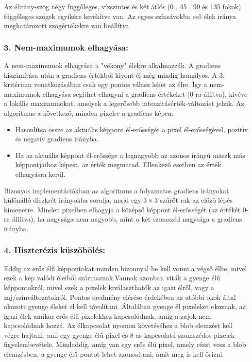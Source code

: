 Az élirány-szög négy függőleges, vízszintes és két átlós (0 , 45 , 90  és 135 fokok) függőleges szögek egyikére kerekítve van. Az egyes színsávokba eső élek iránya meghatározott szögértékekre van beállítva.

\subsubsection{3. Nem-maximumok elhagyása:}

A nem-maximumok elhagyása a "vékony" élekre alkalmazzák. A gradiens kiszámítása után a gradiens értékből kivont él még mindig homályos. A 3. kritérium vonatkozásában csak egy pontos válasz lehet az élre. Így a nem-maximumok elhagyása segíthet elhagyni a gradiens értékeket (0-ra állítva), kivéve a lokális maximumokat, amelyek a legerősebb intenzitásérték-változást jelzik. Az algoritmus a következő, minden pixelre a gradiens képen:
\begin{itemize}
\item Hasonlítsa össze az aktuális képpont él-erősségét a pixel él-erősségével, pozitív és negatív gradiens irányba.
\item Ha az aktuális képpont él-erőssége a legnagyobb az azonos irányú maszk más képpontjaihoz képest, az érték megmarad. Ellenkező esetben az érték elhagyásra kerül.
\end{itemize}

Bizonyos implementációkban az algoritmus a folyamatos gradiens irányokat különálló diszkrét irányokba sorolja, majd egy $3 \times 3$ szűrőt rak az előző lépés kimenetre. Minden pixelben elhagyja a középső képpont él-erősségét (az értékét 0-ra állítva), ha nagysága nem nagyobb, mint a két szomszéd nagysága a gradiens irányba.

\subsubsection{4. Hiszterézis küszöbölés:}

Eddig az erős élű képpontokat minden bizonnyal be kell vonni a végső élbe, mivel ezek a kép valódi éleiből származnak.Vannak azonban viták a gyenge élű képpontokról, mivel ezek a pixelek kiválaszthatók az igazi élről, vagy a zaj/színváltozatokról. Pontos eredmény elérése érdekében az utóbbi okok által okozott gyenge éleket el kell távolítani. Általában gyenge él pixeleket okoznak, az igazi élek amikor erős élű pixelekhez kapcsolódnak, amíg a zajok nem kapcsolódnak hozzá. Az élkapcsolat nyomon követéséhez a blob elemzést kell végre hajtani, ami egy gyenge élű pixel és 8-as kapcsolatú szomszédos pixelek figyelembevétele. Mindaddig, amíg van egy erős élű pixel, amely részt vesz a blob elemzésben, a gyenge élű pontot lehet azonosítani, amit meg is kell őrizni.

